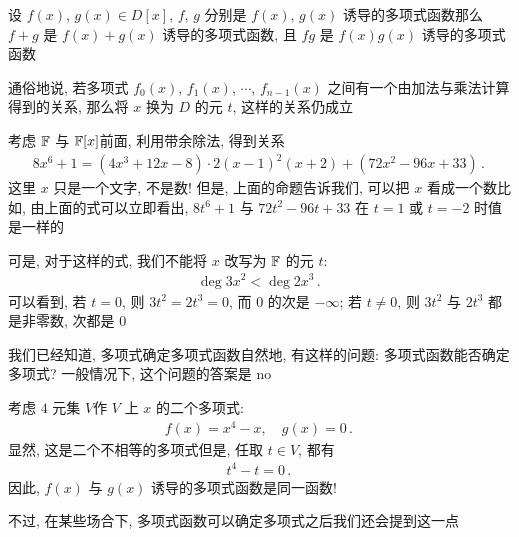 \begin{proposition}
    设 $f(x)$, $g(x) \in D[x]$, $f$, $g$ 分别是 $f(x)$, $g(x)$ 诱导的多项式函数\period 那么 $f+g$ 是 $f(x)+g(x)$ 诱导的多项式函数, 且 $fg$ 是 $f(x)g(x)$ 诱导的多项式函数\period

    通俗地说, 若多项式 $f_0 (x)$, $f_1 (x)$, $\cdots$, $f_{n-1} (x)$ 之间有一个由加法与乘法计算得到的关系, 那么将 $x$ 换为 $D$ 的元 $t$, 这样的关系仍成立\period
\end{proposition}

\begin{example}
    考虑 $\mathbb{F}$ 与 $\mathbb{F}[x]$\period 前面, 利用带余除法, 得到关系
    \begin{align*}
        8x^6 + 1 = (4x^3 + 12x - 8) \cdot 2(x-1)^2 (x+2) + (72x^2 - 96x + 33) \period
    \end{align*}
    这里 $x$ 只是一个文字, 不是数! 但是, 上面的命题告诉我们, 可以把 $x$ 看成一个数\period 比如, 由上面的式可以立即看出, $8t^6 + 1$ 与 $72t^2 - 96t + 33$ 在 $t = 1$ 或 $t = -2$ 时值是一样的\period

    可是, 对于这样的式, 我们不能将 $x$ 改写为 $\mathbb{F}$ 的元 $t$:
    \begin{align*}
        \deg 3x^2 < \deg 2x^3 \period
    \end{align*}
    可以看到, 若 $t=0$, 则 $3t^2 = 2t^3 = 0$, 而 $0$ 的次是 $-\infty$; 若 $t \neq 0$, 则 $3t^2$ 与 $2t^3$ 都是非零数, 次都是 $0$\period
\end{example}

\begin{remark}
    我们已经知道, 多项式确定多项式函数\period 自然地, 有这样的问题: 多项式函数能否确定多项式? 一般情况下, 这个问题的答案是 no\period

    考虑 $4$ 元集 $V$\period 作 $V$ 上 $x$ 的二个多项式:
    \begin{align*}
        f(x) = x^4 - x, \quad g(x) = 0 \period
    \end{align*}
    显然, 这是二个不相等的多项式\period 但是, 任取 $t \in V$, 都有
    \begin{align*}
        t^4 - t = 0 \period
    \end{align*}
    因此, $f(x)$ 与 $g(x)$ 诱导的多项式函数是同一函数!

    不过, 在某些场合下, 多项式函数可以确定多项式\period 之后我们还会提到这一点\period
\end{remark}

